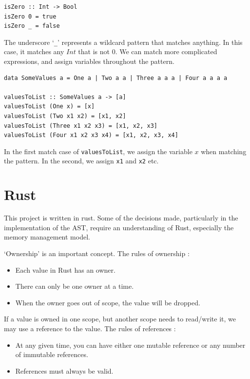\begin{verbatim}
isZero :: Int -> Bool
isZero 0 = true
isZero _ = false
\end{verbatim}

\noindent The underscore `\verb|_|' represents a wildcard pattern that matches anything. In this case, it matches any $Int$ that is not $0$. We can match more complicated expressions, and assign variables throughout the pattern.

\begin{verbatim}
data SomeValues a = One a | Two a a | Three a a a | Four a a a a

valuesToList :: SomeValues a -> [a]
valuesToList (One x) = [x]
valuesToList (Two x1 x2) = [x1, x2]
valuesToList (Three x1 x2 x3) = [x1, x2, x3]
valuesToList (Four x1 x2 x3 x4) = [x1, x2, x3, x4]
\end{verbatim}

\noindent In the first match case of \verb|valuesToList|, we assign the variable $x$ when matching the pattern. In the second, we assign \verb|x1| and \verb|x2| etc. 

\section{Rust}
\label{bg:rust}

This project is written in rust.  Some of the decisions made, particularly in the implementation of the AST, require an understanding of Rust, especially the memory management model.

`Ownership' is an important concept. The rules of ownership \cite{rust_book}:
\begin{itemize}
    \item Each value in Rust has an owner.
    \item There can only be one owner at a time.
    \item When the owner goes out of scope, the value will be dropped.
\end{itemize}   

If a value is owned in one scope, but another scope needs to read/write it, we may use a reference to the value. The rules of references \cite{rust_book}:
\begin{itemize}
    \item At any given time, you can have either one mutable reference or any number of immutable references. 
    \item References must always be valid.
\end{itemize}

